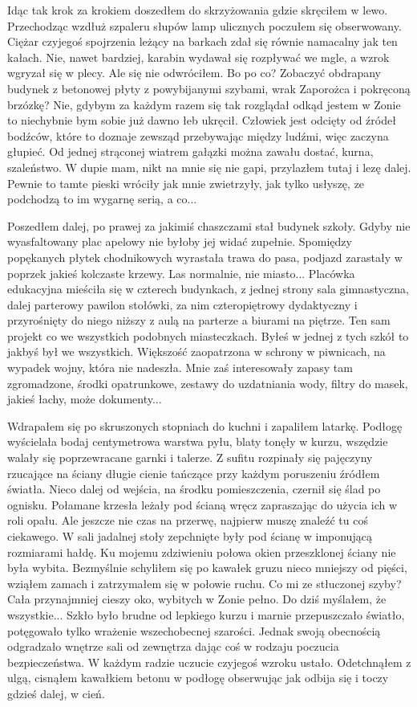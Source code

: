 \documentclass[../MAIN.tex]{subfiles}
\begin{document}
Idąc tak krok za krokiem doszedłem do skrzyżowania gdzie skręciłem w lewo. Przechodząc wzdłuż szpaleru słupów lamp ulicznych poczułem się obserwowany. Ciężar czyjegoś spojrzenia leżący na barkach zdał się równie namacalny jak ten kałach. Nie, nawet bardziej, karabin wydawał się rozpływać we mgle, a wzrok wgryzał się w plecy. Ale się nie odwróciłem. Bo po co? Zobaczyć obdrapany budynek z betonowej płyty z powybijanymi szybami, wrak Zaporożca i pokręconą brzózkę? Nie, gdybym za każdym razem się tak rozglądał odkąd jestem w Zonie to niechybnie bym sobie już dawno łeb ukręcił. Człowiek jest odcięty od źródeł bodźców, które to doznaje zewsząd przebywając między ludźmi, więc zaczyna głupieć. Od jednej strąconej wiatrem gałązki można zawału dostać, kurna, szaleństwo. W dupie mam, nikt na mnie się nie gapi, przylazłem tutaj i lezę dalej. Pewnie to tamte pieski wróciły jak mnie zwietrzyły, jak tylko usłyszę, ze podchodzą to im wygarnę serią, a co...

Poszedłem dalej, po prawej za jakimiś chaszczami stał budynek szkoły. Gdyby nie wyasfaltowany plac apelowy nie byłoby jej widać zupełnie. Spomiędzy popękanych płytek chodnikowych wyrastała trawa do pasa, podjazd zarastały w poprzek jakieś kolczaste krzewy. Las normalnie, nie miasto... Placówka edukacyjna mieściła się w czterech budynkach, z jednej strony sala gimnastyczna, dalej parterowy pawilon stołówki, za nim czteropiętrowy dydaktyczny i przyrośnięty do niego niższy z aulą na parterze a biurami na piętrze. Ten sam projekt co we wszystkich podobnych miasteczkach. Byłeś w jednej z tych szkół to jakbyś był we wszystkich. Większość zaopatrzona w schrony w piwnicach, na wypadek wojny, która nie nadeszła. Mnie zaś interesowały zapasy tam zgromadzone, środki opatrunkowe, zestawy do uzdatniania wody, filtry do masek, jakieś łachy, może dokumenty...

Wdrapałem się po skruszonych stopniach do kuchni i zapaliłem latarkę. Podłogę wyścielała bodaj centymetrowa warstwa pyłu, blaty tonęły w kurzu, wszędzie walały się poprzewracane garnki i talerze. Z sufitu rozpinały się pajęczyny rzucające na ściany długie cienie tańczące przy każdym poruszeniu źródłem światła. Nieco dalej od wejścia, na środku pomieszczenia, czernił się ślad po ognisku. Połamane krzesła leżały pod ścianą wręcz zapraszając do użycia ich w roli opału. Ale jeszcze nie czas na przerwę, najpierw muszę znaleźć tu coś ciekawego. W sali jadalnej stoły zepchnięte były pod ścianę w imponującą rozmiarami hałdę. Ku mojemu zdziwieniu połowa okien przeszklonej ściany nie była wybita. Bezmyślnie schyliłem się po kawałek gruzu nieco mniejszy od pięści, wziąłem zamach i zatrzymałem się w połowie ruchu. Co mi ze stłuczonej szyby? Cała przynajmniej cieszy oko, wybitych w Zonie pełno. Do dziś myślałem, że wszystkie... Szkło było brudne od lepkiego kurzu i marnie przepuszczało światło, potęgowało tylko wrażenie wszechobecnej szarości. Jednak swoją obecnością odgradzało wnętrze sali od zewnętrza dając coś w rodzaju poczucia bezpieczeństwa. W każdym radzie uczucie czyjegoś wzroku ustało. Odetchnąłem z ulgą, cisnąłem kawałkiem betonu w podłogę obserwując jak odbija się i toczy gdzieś dalej, w cień.
\end{document}
